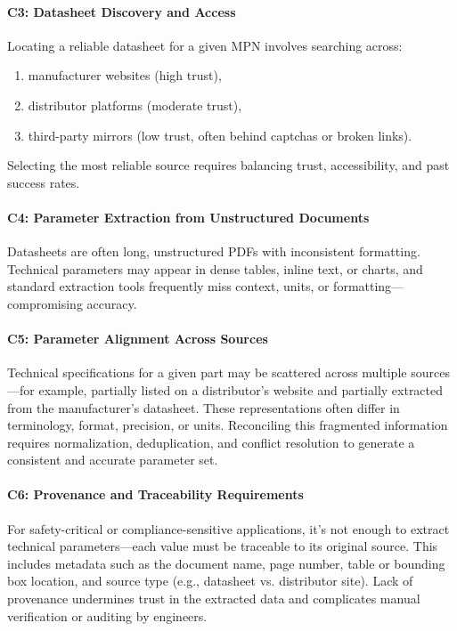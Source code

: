 \paragraph{C3: Datasheet Discovery and Access}
Locating a reliable datasheet for a given MPN involves searching across:
\begin{enumerate}
\item manufacturer websites (high trust),
\item distributor platforms (moderate trust),
\item third-party mirrors (low trust, often behind captchas or broken links).
\end{enumerate}
Selecting the most reliable source requires balancing trust, accessibility, and past success rates.

\paragraph{C4: Parameter Extraction from Unstructured Documents}
Datasheets are often long, unstructured PDFs with inconsistent formatting.
Technical parameters may appear in dense tables, inline text, or charts, and standard extraction tools frequently miss context, units, or formatting—compromising accuracy.

\paragraph{C5: Parameter Alignment Across Sources}
Technical specifications for a given part may be scattered across multiple sources—for example, partially listed on a distributor's website and partially extracted from the manufacturer's datasheet.
These representations often differ in terminology, format, precision, or units.
Reconciling this fragmented information requires normalization, deduplication, and conflict resolution to generate a consistent and accurate parameter set.

\paragraph{C6: Provenance and Traceability Requirements}
For safety-critical or compliance-sensitive applications, it's not enough to extract technical parameters—each value must be traceable to its original source.
This includes metadata such as the document name, page number, table or bounding box location, and source type (e.g., datasheet vs. distributor site).
Lack of provenance undermines trust in the extracted data and complicates manual verification or auditing by engineers.

